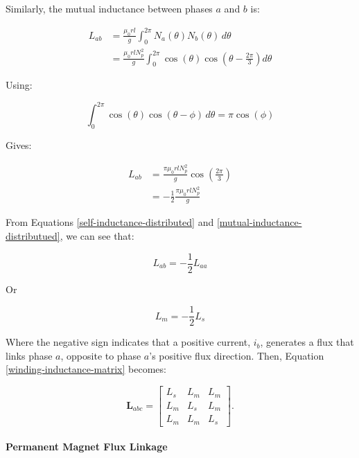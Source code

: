 \documentclass{article}
\begin{document}
Similarly, the mutual inductance between phases $a$ and $b$ is:

\begin{align}
    L_{ab} &= \frac{\mu_0 r l}{g} \int_0^{2\pi} N_a(\theta)N_b(\theta)\,d\theta \\[10pt]
    &= \frac{\mu_0 r l N_p^2}{g} \int_0^{2\pi} \cos(\theta) \cos\left(\theta-\frac{2\pi}{3}\right)d\theta
\end{align}

Using:

\begin{equation}
    \int_0^{2\pi} \cos(\theta)\cos(\theta-\phi)\,d\theta = \pi\cos(\phi)
\end{equation}

Gives:

\begin{align}
\label{mutual-inductance-distributued}
    L_{ab} &= \frac{\pi\mu_0 r l N_p^2}{g} \cos\left(\frac{2\pi}{3}\right) \\
    &= -\frac{1}{2} \frac{\pi\mu_0 r l N_p^2}{g}
\end{align}

From Equations \ref{self-inductance-distributed} and \ref{mutual-inductance-distributued}, we can see that:

\begin{equation}
    L_{ab} = -\frac{1}{2}L_{aa}
\end{equation}

Or

\begin{equation}
    L_m = -\frac{1}{2}L_{s}
\end{equation}

Where the negative sign indicates that a positive current, $i_b$, generates a flux that links phase $a$, opposite to phase $a$'s positive flux direction. Then, Equation \ref{winding-inductance-matrix} becomes:

\begin{equation}
\mathbf{L}_{abc}
=
\begin{bmatrix}
L_s & L_m & L_m \\
L_m & L_s & L_m \\
L_m & L_m & L_s
\end{bmatrix}.
\end{equation}


\paragraph{Permanent Magnet Flux Linkage}
\label{pm-flux-linakge}
\end{document}
